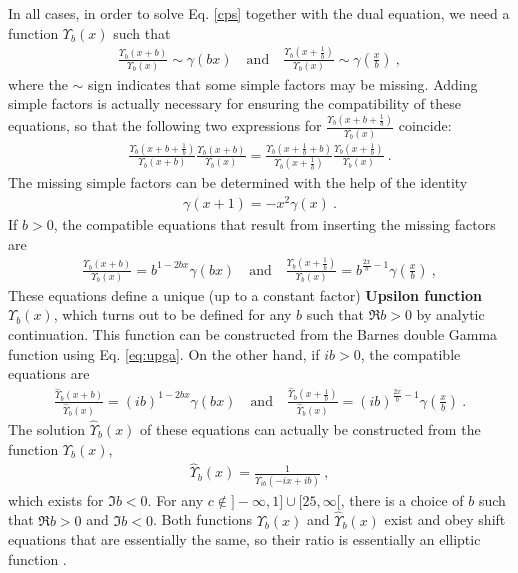 \documentclass[12pt, a4paper, notitlepage, twoside]{report}
\numberwithin{equation}{section}
\theoremstyle{break}
\begin{document}
In all cases, in order to solve Eq. \eqref{cps} together with the dual equation, we need a function $\Upsilon_b(x)$ such that 
\begin{align}
 \frac{\Upsilon_b(x+b)}{\Upsilon_b(x)} \sim \gamma(bx)\quad \text{and} \quad \frac{\Upsilon_b(x+\frac{1}{b})}{\Upsilon_b(x)} \sim \gamma(\tfrac{x}{b})\ ,
\end{align}
where the $\sim$ sign indicates that some simple factors may be missing.
Adding simple factors is actually necessary for ensuring the compatibility of these equations, so that the following two expressions for $ \frac{\Upsilon_b(x+b+\frac{1}{b})}{\Upsilon_b(x)}$ coincide:
\begin{align}
  \frac{\Upsilon_b(x+b+\frac{1}{b})}{\Upsilon_b(x+b)} \frac{\Upsilon_b(x+b)}{\Upsilon_b(x)} = \frac{\Upsilon_b(x+\frac{1}{b}+b)}{\Upsilon_b(x+\frac{1}{b})} \frac{\Upsilon_b(x+\frac{1}{b})}{\Upsilon_b(x)} \ .
\end{align}
The missing simple factors can be determined with the help of the identity
\begin{align}
 \gamma(x+1) = -x^2 \gamma(x) \ .
\end{align}
If $b>0$, the compatible equations that result from inserting the missing factors are 
\begin{align}
  \boxed{\frac{\Upsilon_b(x+b)}{\Upsilon_b(x)} = b^{1-2bx} \gamma(bx)}\quad \text{and} \quad \boxed{\frac{\Upsilon_b(x+\frac{1}{b})}{\Upsilon_b(x)} = b^{\frac{2x}{b}-1} \gamma(\tfrac{x}{b})}\ ,
\label{upup}
\end{align}
These equations define a unique (up to a constant factor) \textbf{Upsilon function} $\Upsilon_b(x)$, which turns out to be defined for any $b$ such that $\Re b > 0$ by analytic continuation. 
This function can be constructed from the Barnes double Gamma function using Eq. \eqref{eq:upga}.
On the other hand, if $ib>0$, the compatible equations are 
\begin{align}
 \frac{\hat{\Upsilon}_b(x+b)}{\hat{\Upsilon}_b(x)} = (ib)^{1-2bx} \gamma(bx)\quad \text{and} \quad \frac{\hat{\Upsilon}_b(x+\frac{1}{b})}{\hat{\Upsilon}_b(x)} = (ib)^{\frac{2x}{b}-1} \gamma(\tfrac{x}{b})\ .
\end{align}
The solution $\hat\Upsilon_b(x)$ of these equations can actually be constructed from the function $\Upsilon_b(x)$,
\begin{align}
 \boxed{ \hat{\Upsilon}_b(x) = \frac{1}{\Upsilon_{ib}(-ix+ib)} }\ ,
\label{tub}
\end{align}
which exists for $\Im b < 0$. 
For any $c\notin ]-\infty, 1] \cup [25,\infty[$, there is a choice of $b$ such that $\Re b>0$ and $\Im b<0$. 
Both functions $\Upsilon_b(x)$ and $\hat\Upsilon_b(x)$ exist and obey shift equations that are essentially the same, so their ratio is essentially an elliptic function \cite{zam05}. 
\end{document}
